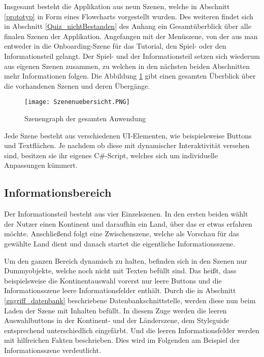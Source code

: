 Insgesamt besteht die Applikation aus neun Szenen, welche in Abschnitt \ref{prototyp} in Form eines Flowcharts vorgestellt wurden.
Des weiteren findet sich in Abschnitt \ref{Quiz_nichtBestanden} des Anhang ein Gesamtüberblick über alle finalen Szenen der Applikation.
Angefangen mit der Menüszene, von der aus man entweder in die Onboarding-Szene für das Tutorial, den Spiel- oder den Informationsteil gelangt. 
Der Spiel- und der Informationsteil setzen sich wiederum aus eigenen Szenen zusammen, zu welchen in den nächsten beiden Abschnitten mehr Informationen folgen. 
Die Abbildung \ref{fig:scenegraph} gibt einen gesamten Überblick über die vorhandenen Szenen und deren Übergänge.

\begin{figure} [h]
\centering
\texttt{[image: Szenenuebersicht.PNG]}
\caption{Szenengraph der gesamten Anwendung}
\label{fig:scenegraph}
\end{figure}

Jede Szene besteht aus verschiedenen UI-Elementen, wie beispielsweise Buttons und Textflächen. Je nachdem ob diese mit dynamischer Interaktivität versehen sind, besitzen sie ihr eigenes C\#-Script, welches sich um individuelle Anpassungen kümmert.

\subsection{Informationsbereich}
Der Informationsteil besteht aus vier Einzelszenen. 
In den ersten beiden wählt der Nutzer einen Kontinent und daraufhin ein Land, über das er etwas erfahren möchte.
Anschließend folgt eine Zwischenszene, welche als Vorschau für das gewählte Land dient und danach startet die eigentliche Informationsszene. 

Um den ganzen Bereich dynamisch zu halten, befinden sich in den Szenen nur Dummyobjekte, welche noch nicht mit Texten befüllt sind. Das heißt, dass beispielsweise die Kontinentauswahl vorerst nur leere Buttons und die Informationsszene leere Informationsfelder enthält.
Durch die in Abschnitt \ref{zugriff_datenbank} beschriebene Datenbankschnittstelle, werden diese nun beim Laden der Szene mit Inhalten befüllt. 
In diesem Zuge werden die leeren Auswahlbuttons in der Kontinent- und der Länderszene, dem Styleguide entsprechend unterschiedlich eingefärbt. Und die leeren Informationsfelder werden mit hilfreichen Fakten beschrieben.
Dies wird im Folgenden am Beispiel der Informationsszene verdeutlicht.

